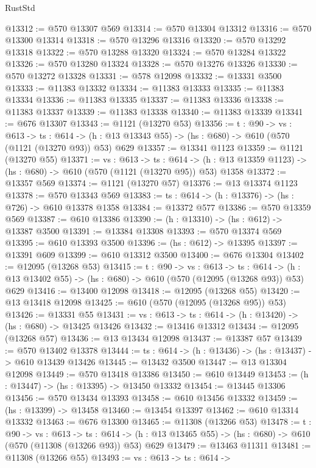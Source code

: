 \begin{lexlean}{RustStd}
\begin{coremodule}
@13312 := @570 @13307 @569
@13314 := @570 @13304 @13312
@13316 := @570 @13300 @13314
@13318 := @570 @13296 @13316
@13320 := @570 @13292 @13318
@13322 := @570 @13288 @13320
@13324 := @570 @13284 @13322
@13326 := @570 @13280 @13324
@13328 := @570 @13276 @13326
@13330 := @570 @13272 @13328
@13331 := @578 @12098
@13332 := @13331 @3500
@13333 := @11383 @13332
@13334 := @11383 @13333
@13335 := @11383 @13334
@13336 := @11383 @13335
@13337 := @11383 @13336
@13338 := @11383 @13337
@13339 := @11383 @13338
@13340 := @11383 @13339
@13341 := @676 @13307
@13343 := @1121 (@13270 @53)
@13356 := {t : @90} ->
  {vs : @613} ->
  {ts : @614} -> (h : @13 @13343 @55) -> (hs : @680) -> @610 (@570 (@1121 (@13270 @93)) @53) @629
@13357 := @13341 @1123
@13359 := @1121 (@13270 @55)
@13371 := {vs : @613} ->
  {ts : @614} -> (h : @13 @13359 @1123) -> (hs : @680) -> @610 (@570 (@1121 (@13270 @95)) @53) @1358
@13372 := @13357 @569
@13374 := @1121 (@13270 @57)
@13376 := @13 @13374 @1123
@13378 := @570 @13343 @569
@13383 := {ts : @614} -> (h : @13376) -> (hs : @726) -> @610 @13378 @1358
@13384 := @13372 @577
@13386 := @570 @13359 @569
@13387 := @610 @13386
@13390 := (h : @13310) -> (hs : @612) -> @13387 @3500
@13391 := @13384 @13308
@13393 := @570 @13374 @569
@13395 := @610 @13393 @3500
@13396 := (hs : @612) -> @13395
@13397 := @13391 @609
@13399 := @610 @13312 @3500
@13400 := @676 @13304
@13402 := @12095 (@13268 @53)
@13415 := {t : @90} ->
  {vs : @613} ->
  {ts : @614} -> (h : @13 @13402 @55) -> (hs : @680) -> @610 (@570 (@12095 (@13268 @93)) @53) @629
@13416 := @13400 @12098
@13418 := @12095 (@13268 @55)
@13420 := @13 @13418 @12098
@13425 := @610 (@570 (@12095 (@13268 @95)) @53)
@13426 := @13331 @55
@13431 := {vs : @613} -> {ts : @614} -> (h : @13420) -> (hs : @680) -> @13425 @13426
@13432 := @13416 @13312
@13434 := @12095 (@13268 @57)
@13436 := @13 @13434 @12098
@13437 := @13387 @57
@13439 := @570 @13402 @13378
@13444 := {ts : @614} -> (h : @13436) -> (hs : @13437) -> @610 @13439 @13426
@13445 := @13432 @3500
@13447 := @13 @13304 @12098
@13449 := @570 @13418 @13386
@13450 := @610 @13449
@13453 := (h : @13447) -> (hs : @13395) -> @13450 @13332
@13454 := @13445 @13306
@13456 := @570 @13434 @13393
@13458 := @610 @13456 @13332
@13459 := (hs : @13399) -> @13458
@13460 := @13454 @13397
@13462 := @610 @13314 @13332
@13463 := @676 @13300
@13465 := @11308 (@13266 @53)
@13478 := {t : @90} ->
  {vs : @613} ->
  {ts : @614} -> (h : @13 @13465 @55) -> (hs : @680) -> @610 (@570 (@11308 (@13266 @93)) @53) @629
@13479 := @13463 @11311
@13481 := @11308 (@13266 @55)
@13493 := {vs : @613} ->
  {ts : @614} ->

\end{coremodule}
\end{lexlean}
